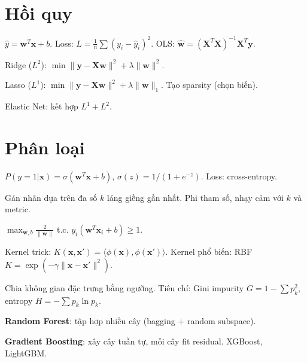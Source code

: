\documentclass[12pt,a4paper]{article}
\begin{document}
\section{Hồi quy}

\begin{dinhnghia}[title={Hồi quy tuyến tính}]
  $\hat{y} = \mathbf{w}^T\mathbf{x} + b$. Loss: $L = \frac{1}{n}\sum(y_i - \hat{y}_i)^2$. OLS: $\hat{\mathbf{w}} = (\mathbf{X}^T\mathbf{X})^{-1}\mathbf{X}^T\mathbf{y}$.
\end{dinhnghia}

\begin{dinhnghia}[title={Regularization}]
  Ridge ($L^2$): $\min \|\mathbf{y} - \mathbf{X}\mathbf{w}\|^2 + \lambda\|\mathbf{w}\|^2$.

  Lasso ($L^1$): $\min \|\mathbf{y} - \mathbf{X}\mathbf{w}\|^2 + \lambda\|\mathbf{w}\|_1$. Tạo sparsity (chọn biến).

  Elastic Net: kết hợp $L^1 + L^2$.
\end{dinhnghia}

\section{Phân loại}

\begin{dinhnghia}[title={Hồi quy logistic}]
  $P(y=1|\mathbf{x}) = \sigma(\mathbf{w}^T\mathbf{x} + b)$, $\sigma(z) = 1/(1+e^{-z})$. Loss: cross-entropy.
\end{dinhnghia}

\begin{dinhnghia}[title={k-NN (k Nearest Neighbors)}]
  Gán nhãn dựa trên đa số $k$ láng giềng gần nhất. Phi tham số, nhạy cảm với $k$ và metric.
\end{dinhnghia}

\begin{dinhnghia}[title={SVM (Support Vector Machine)}]
  $\max_{\mathbf{w}, b} \frac{2}{\|\mathbf{w}\|}$ t.c. $y_i(\mathbf{w}^T\mathbf{x}_i + b) \ge 1$.

  Kernel trick: $K(\mathbf{x}, \mathbf{x}') = \langle\phi(\mathbf{x}), \phi(\mathbf{x}')\rangle$. Kernel phổ biến: RBF $K = \exp(-\gamma\|\mathbf{x} - \mathbf{x}'\|^2)$.
\end{dinhnghia}

\begin{dinhnghia}[title={Cây quyết định}]
  Chia không gian đặc trưng bằng ngưỡng. Tiêu chí: Gini impurity $G = 1 - \sum p_k^2$, entropy $H = -\sum p_k\ln p_k$.

  \textbf{Random Forest}: tập hợp nhiều cây (bagging + random subspace).

  \textbf{Gradient Boosting}: xây cây tuần tự, mỗi cây fit residual. XGBoost, LightGBM.
\end{dinhnghia}
\end{document}
